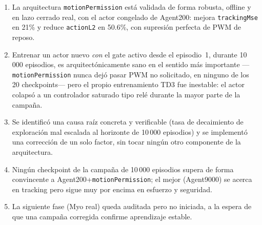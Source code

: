 \documentclass[11pt,a4paper]{article}
\begin{document}
\begin{enumerate}
  \item La arquitectura \texttt{motionPermission} está validada de forma robusta,
    offline y en lazo cerrado real, con el actor congelado de Agent200: mejora
    \texttt{trackingMse} en 21\% y reduce \texttt{actionL2} en 50.6\%, con supresión
    perfecta de PWM de reposo.
  \item Entrenar un actor nuevo \emph{con} el gate activo desde el episodio~1, durante
    10\,000 episodios, es arquitectónicamente sano en el sentido más importante
    ---\texttt{motionPermission} nunca dejó pasar PWM no solicitado, en ninguno de los
    20 checkpoints--- pero el propio entrenamiento TD3 fue inestable: el actor colapsó
    a un controlador saturado tipo relé durante la mayor parte de la campaña.
  \item Se identificó una causa raíz concreta y verificable (tasa de decaimiento de
    exploración mal escalada al horizonte de 10\,000 episodios) y se implementó una
    corrección de un solo factor, sin tocar ningún otro componente de la arquitectura.
  \item Ningún checkpoint de la campaña de 10\,000 episodios supera de forma
    convincente a Agent200+\texttt{motionPermission}; el mejor (Agent9000) se acerca en
    tracking pero sigue muy por encima en esfuerzo y seguridad.
  \item La siguiente fase (Myo real) queda auditada pero no iniciada, a la espera de
    que una campaña corregida confirme aprendizaje estable.
\end{enumerate}
\end{document}
